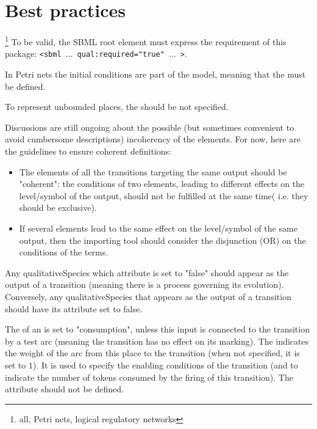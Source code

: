 
\section{Best practices}
\label{best-practices}




\ALL\footnote{\ALL all, \PN Petri nets, \LRG logical regulatory networks} To be valid, the SBML root element must express the requirement of this package: \texttt{<sbml $\dots$ qual:required="true" $\dots$ >}.

\medskip
\PN In Petri nets the initial conditions are part of the model, meaning that the  must be defined.

\medskip
\PN To represent unbounded places, the  should be not specified.

\medskip
\LRG Discussions are still ongoing about the possible (but sometimes convenient to avoid cumbersome descriptions) incoherency of the  elements. For now, here are the guidelines to ensure coherent definitions:
\begin{itemize}
\item The  elements of all the transitions targeting the same output should be "coherent": the conditions of two  elements, leading to different effects on the level/symbol of the output, should not be fulfilled at the same time( i.e. they should be exclusive).
\item If several  elements lead to the same effect on the level/symbol of the same output, then the importing tool should consider the disjunction (OR) on the conditions of the terms. 
\end{itemize}
\medskip

\LRG Any qualitativeSpecies which attribute  is set to "false" should appear as the output of a transition (meaning there is a process governing its evolution). Conversely, any qualitativeSpecies that appears as the output of a transition should have its attribute  set to false.

\medskip
\PN  The  of an  is set to "consumption", unless this input is connected to the transition by a test arc (meaning the transition has no effect on its marking). The  indicates the weight of the arc from this place to the transition (when not specified, it is set to $1$). It is used to specify the enabling conditions of the transition (and to indicate the number of tokens consumed by the firing of this transition). The  attribute should not be defined.

